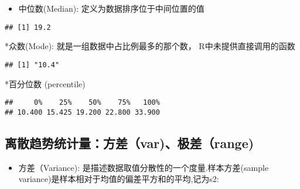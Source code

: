 \documentclass[]{book}
\newenvironment{Shaded}{\begin{snugshade}}{\end{snugshade}}
\newcommand{\KeywordTok}[1]{\textcolor[rgb]{0.13,0.29,0.53}{\textbf{#1}}}
\newcommand{\NormalTok}[1]{#1}
\newcommand{\OperatorTok}[1]{\textcolor[rgb]{0.81,0.36,0.00}{\textbf{#1}}}
\providecommand{\tightlist}{%
  \setlength{\itemsep}{0pt}\setlength{\parskip}{0pt}}
\begin{document}
\begin{itemize}
\tightlist
\item
  中位数(Median): 定义为数据排序位于中间位置的值
\end{itemize}

\begin{Shaded}
\end{Shaded}

\begin{verbatim}
## [1] 19.2
\end{verbatim}

*众数(Mode): 就是一组数据中占比例最多的那个数， R中未提供直接调用的函数

\begin{Shaded}
\end{Shaded}

\begin{verbatim}
## [1] "10.4"
\end{verbatim}

*百分位数 (percentile)

\begin{Shaded}
\end{Shaded}

\begin{verbatim}
##     0%    25%    50%    75%   100% 
## 10.400 15.425 19.200 22.800 33.900
\end{verbatim}

\hypertarget{varrange}{%
\subsection{离散趋势统计量：方差（var)、极差（range)}\label{varrange}}

\begin{itemize}
\tightlist
\item
  方差（Variance): 是描述数据取值分散性的一个度量.样本方差(sample
  variance)是样本相对于均值的偏差平方和的平均,记为s2:
\end{itemize}
\end{document}
